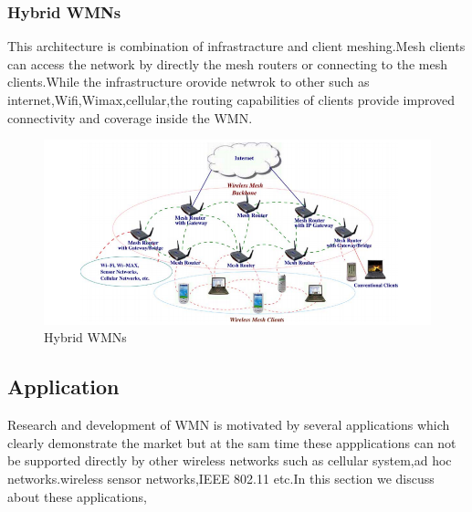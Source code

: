 \documentclass[12pt,a4paper]{report}
\begin{document}
\subsubsection{Hybrid WMNs}
This architecture is combination of infrastracture and client meshing.Mesh clients can access the network by directly the mesh routers or connecting to the mesh clients.While the infrastructure orovide netwrok to other such as internet,Wifi,Wimax,cellular,the routing capabilities of clients provide improved connectivity and coverage inside the WMN.

\begin{figure}[hbtp]
\centering
\includegraphics[scale=0.5]{hybrid-wmn.png}
\caption{Hybrid WMNs}
\end{figure}



\subsection{Application}
Research and development of WMN is motivated by several applications which clearly demonstrate the market but at the sam time these appplications can not be supported directly by other wireless networks such as cellular system,ad hoc networks.wireless sensor networks,IEEE 802.11 etc.In this section we discuss about these applications,
\end{document}
